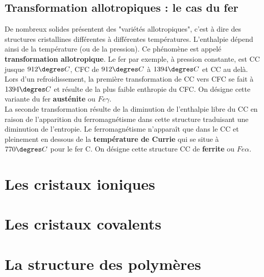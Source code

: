 		\subsection{Transformation allotropiques : le cas du fer}
			De nombreux solides présentent des "variétés allotropiques", c'est à dire des structures cristallines différentes à différentes températures. L'enthalpie dépend ainsi de la température (ou de la pression). Ce phénomène est appelé \textbf{transformation allotropique}. Le fer par exemple, à pression constante, est CC jusque $912\degres C$, CFC de $912\degres C$ à $1394\degres C$ et CC au delà. \\
			Lors d'un refroidissement, la première transformation de CC vers CFC se fait à $1394 \degres C$ et résulte de la plus faible enthropie du CFC. On désigne cette variante du fer \textbf{austénite} ou $Fe\gamma$. \\
			La seconde transformation résulte de la diminution de l'enthalpie libre du CC en raison de l'apparition du ferromagnétisme dans cette structure traduisant une diminution de l'entropie. Le ferromagnétisme n'apparaît que dans le CC et pleinement en dessous de la \textbf{température de Currie} qui se situe à $770\degres C$ pour le fer C. On désigne cette structure CC de \textbf{ferrite} ou $Fe \alpha$.
			
\section{Les cristaux ioniques}
\section{Les cristaux covalents}
\section{La structure des polymères}